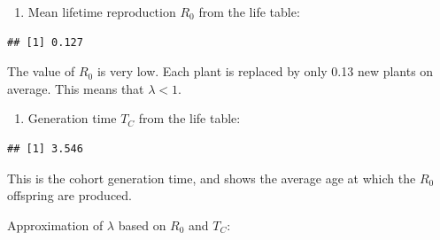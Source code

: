 \documentclass[
]{book}
\newenvironment{Shaded}{\begin{snugshade}}{\end{snugshade}}
\newcommand{\AttributeTok}[1]{\textcolor[rgb]{0.77,0.63,0.00}{#1}}
\newcommand{\DecValTok}[1]{\textcolor[rgb]{0.00,0.00,0.81}{#1}}
\newcommand{\FunctionTok}[1]{\textcolor[rgb]{0.00,0.00,0.00}{#1}}
\newcommand{\NormalTok}[1]{#1}
\newcommand{\OtherTok}[1]{\textcolor[rgb]{0.56,0.35,0.01}{#1}}
\newcommand{\SpecialCharTok}[1]{\textcolor[rgb]{0.00,0.00,0.00}{#1}}
\providecommand{\tightlist}{%
  \setlength{\itemsep}{0pt}\setlength{\parskip}{0pt}}
\begin{document}
\begin{enumerate}
\def\labelenumi{\arabic{enumi}.}
\setcounter{enumi}{4}
\tightlist
\item
  Mean lifetime reproduction \(R_0\) from the life table:
\end{enumerate}

\begin{Shaded}
\end{Shaded}

\begin{verbatim}
## [1] 0.127
\end{verbatim}

The value of \(R_0\) is very low. Each plant is replaced by only 0.13 new plants on average. This means that \(\lambda<1\).

\begin{enumerate}
\def\labelenumi{\arabic{enumi}.}
\setcounter{enumi}{5}
\tightlist
\item
  Generation time \(T_C\) from the life table:
\end{enumerate}

\begin{Shaded}
\end{Shaded}

\begin{verbatim}
## [1] 3.546
\end{verbatim}

This is the cohort generation time, and shows the average age at which the \(R_0\) offspring are produced.

Approximation of \(\lambda\) based on \(R_0\) and \(T_C\):
\end{document}
